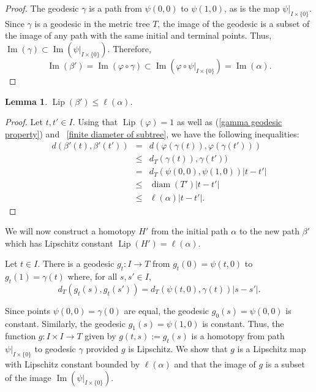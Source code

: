 \documentclass{article}
\newtheorem{lemma}[theorem]{Lemma}
\theoremstyle{definition}
\theoremstyle{remark}
\def\deq{:=}
\DeclareMathOperator{\Ima}{Im}
\newcommand{\length}[1]{\ell}%
\DeclareMathOperator{\Lip}{Lip}
\DeclareMathOperator{\diam}{diam}
\begin{document}
\begin{proof}
The geodesic $\gamma$ is a path from $\psi(0,0)$ to $\psi(1,0)$, as is the map $\psi|_{I\times\{0\}}$. Since $\gamma$ is a geodesic in the metric tree $T$, the image of the geodesic is a subset of the image of any path with the same initial and terminal points. Thus, $\Ima(\gamma)\subset\Ima(\psi|_{I\times\{0\}})$. Therefore,
\[
\Ima(\beta')=\Ima(\varphi\circ\gamma)\subset\Ima(\varphi\circ\psi|_{I\times\{0\}})=\Ima(\alpha).
\]
\end{proof}

\begin{lemma}\label{lipschitz constant of beta prime}
$\Lip(\beta')\leq\length{M}(\alpha)$.
\end{lemma}

\begin{proof}
Let $t, t'\in I$. Using that $\Lip(\varphi)=1$ as well as (\ref{gamma geodesic property}) and ~\ref{finite diameter of subtree}, we have the following inequalities:
\begin{eqnarray*}
d(\beta'(t), \beta'(t')) & = & d(\varphi(\gamma(t)), \varphi(\gamma(t')))  \\
					& \leq & d_T(\gamma(t)), \gamma(t'))  \\
					& = & d_T(\psi(0,0), \psi(1,0))\left| t-t'\right|  \\
					& \leq & \diam(T')\left|t-t'\right|  \\
					& \leq & \length{M}(\alpha)\left|t-t'\right|.
\end{eqnarray*}
\end{proof}

We will now construct a homotopy $H'$ from the initial path $\alpha$ to the new path $\beta'$ which has Lipschitz constant $\Lip(H')=\length{M}(\alpha)$. 

Let $t\in I$. There is a geodesic $g_t:I\rightarrow T$ from $g_t(0)=\psi(t,0)$ to $g_t(1)=\gamma(t)$ where, for all $s, s'\in I$,
\begin{equation}\label{g_t geodesic property}
d_T(g_t(s), g_t(s')) = d_T(\psi(t,0), \gamma(t))\left|s-s'\right|.
\end{equation}

Since points $\psi(0,0)=\gamma(0)$ are equal, the geodesic $g_0(s)=\psi(0,0)$ is constant. Similarly, the geodesic $g_1(s)=\psi(1,0)$ is constant. Thus, the function $g:I\times I\rightarrow T$ given by $g(t,s)\deq g_t(s)$ is a homotopy from path $\psi|_{I\times\{0\}}$ to geodesic $\gamma$ provided $g$ is Lipschitz. We show that $g$ is a Lipschitz map with Lipschitz constant bounded by $\length{M}(\alpha)$ and that the image of $g$ is a subset of the image $\Ima(\psi|_{I\times\{0\}})$.
\end{document}
